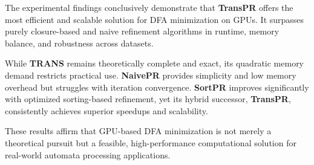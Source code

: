 The experimental findings conclusively demonstrate that \textbf{TransPR} offers the most efficient and scalable solution for DFA minimization on GPUs. It surpasses purely closure-based and naive refinement algorithms in runtime, memory balance, and robustness across datasets. 

While \textbf{TRANS} remains theoretically complete and exact, its quadratic memory demand restricts practical use. \textbf{NaivePR} provides simplicity and low memory overhead but struggles with iteration convergence. \textbf{SortPR} improves significantly with optimized sorting-based refinement, yet its hybrid successor, \textbf{TransPR}, consistently achieves superior speedups and scalability.

These results affirm that GPU-based DFA minimization is not merely a theoretical pursuit but a feasible, high-performance computational solution for real-world automata processing applications.


